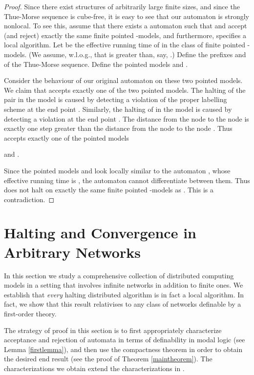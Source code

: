 \documentclass[copyright,creativecommons]{eptcs}
\begin{document}
\begin{proof}
Since there exist structures  of arbitrarily large finite sizes,
and since the Thue-Morse sequence is
cube-free, it is easy to see that our automaton  is strongly nonlocal.
To see this, assume that there exists a automaton  such that
 and  accept (and reject) exactly the same finite pointed -models,
and furthermore,  specifies a local algorithm.
Let  be the effective running time of  in the class
of finite pointed -models. 
(We assume, w.l.o.g., that  is greater than, say, .)
Define the prefixes 
and 
of the Thue-Morse sequence.
Define the pointed models 
and .




Consider the behaviour of our original automaton  on these two
pointed models. We claim that  accepts
exactly one of the two pointed models.
The halting of the pair  in the model 
is caused by detecting a violation of the proper labelling 
scheme  at the end point .
Similarly, the halting of  in the model 
is caused by detecting a violation
at the end point .
The distance from the node  to the node  is
exactly one step greater than
the distance from the node  to the node .
Thus  accepts exactly one of the pointed models

and .




Since the pointed models 
and  look locally similar
to the automaton , whose effective running time is ,
the automaton  cannot differentiate between them.
Thus  does not halt on exactly the same finite
pointed -models as .
This is a contradiction.
\end{proof}




\section{Halting and Convergence in Arbitrary Networks}\label{arbitrary}




In this section we study a 
comprehensive collection of distributed computing models in a setting
that involves infinite networks in addition to finite ones.
We establish that \emph{every} halting distributed algorithm is in fact a local algorithm.
In fact, we show that this result relativises to any class of networks definable by a first-order theory.




The strategy of proof in this section is to first appropriately characterize acceptance and rejection
of automata in terms of definability in modal logic (see Lemma \ref{firstlemma}), and then use the compactness theorem
in order to obtain the desired end result
(see the proof of Theorem \ref{maintheorem}).
The characterizations we obtain extend the
characterizations in \cite{kuusi}.
\end{document}
